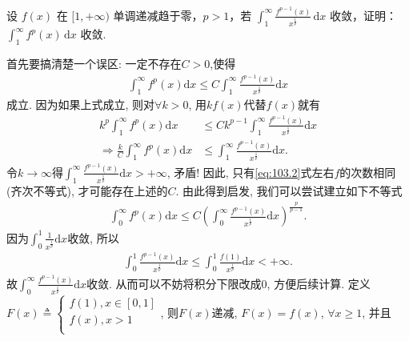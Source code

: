 \documentclass[../../main.tex]{subfiles}
\begin{document}
\begin{example}
设 $f(x)$ 在 $[1,+\infty)$ 单调递减趋于零，$p>1$，若 $\int_{1}^{\infty}\frac{f^{p-1}(x)}{x^{\frac{1}{p}}}\,\mathrm{d}x$ 收敛，证明：$\int_{1}^{\infty}f^{p}(x)\,\mathrm{d}x$ 收敛.
\end{example}
\begin{note}
首先要搞清楚一个误区: 一定不存在$C>0$,使得
\begin{align}\label{eq:103.2}
\int_1^{\infty}{f^p\left( x \right)}\mathrm{d}x\leqslant C\int_1^{\infty}{\frac{f^{p-1}\left( x \right)}{x^{\frac{1}{p}}}\mathrm{d}x}
\end{align}
成立. 因为如果上式成立, 则对$\forall k>0$, 用$kf\left( x \right)$代替$f\left( x \right)$就有
\begin{align*}
k^p\int_1^{\infty}{f^p\left( x \right)}\mathrm{d}x&\leqslant Ck^{p-1}\int_1^{\infty}{\frac{f^{p-1}\left( x \right)}{x^{\frac{1}{p}}}\mathrm{d}x}\\
\Rightarrow \frac{k}{C}\int_1^{\infty}{f^p\left( x \right)}\mathrm{d}x&\leqslant \int_1^{\infty}{\frac{f^{p-1}\left( x \right)}{x^{\frac{1}{p}}}\mathrm{d}x}.
\end{align*}
令$k\rightarrow \infty$得$\int_1^{\infty}{\frac{f^{p-1}\left( x \right)}{x^{\frac{1}{p}}}\mathrm{d}x}>+\infty$, 矛盾!
因此, 只有\eqref{eq:103.2}式左右$f$的次数相同(齐次不等式), 才可能存在上述的$C$.
由此得到启发, 我们可以尝试建立如下不等式
\begin{align*}
\int_0^{\infty}{f^p\left( x \right)}\mathrm{d}x\leqslant C\left( \int_0^{\infty}{\frac{f^{p-1}\left( x \right)}{x^{\frac{1}{p}}}\mathrm{d}x} \right) ^{\frac{p}{p-1}}.
\end{align*}
因为$\int_0^1{\frac{1}{x^{\frac{1}{p}}}\mathrm{d}x}$收敛, 所以
\begin{align*}
\int_0^1{\frac{f^{p-1}\left( x \right)}{x^{\frac{1}{p}}}\mathrm{d}x}\leqslant \int_0^1{\frac{f\left( 1 \right)}{x^{\frac{1}{p}}}\mathrm{d}x}<+\infty .
\end{align*}
故$\int_0^{\infty}{\frac{f^{p-1}\left( x \right)}{x^{\frac{1}{p}}}\mathrm{d}x}$收敛. 从而可以不妨将积分下限改成$0$, 方便后续计算.
定义$F\left( x \right) \triangleq \begin{cases}
	f\left( 1 \right) ,x\in \left[ 0,1 \right]\\
	f\left( x \right) ,x>1\\
\end{cases}$, 则$F\left( x \right) $递减, $F\left( x \right) =f\left( x \right) $, $\forall x\geqslant 1$, 并且
\begin{align*}

\end{align*}
\end{note}
\end{document}
